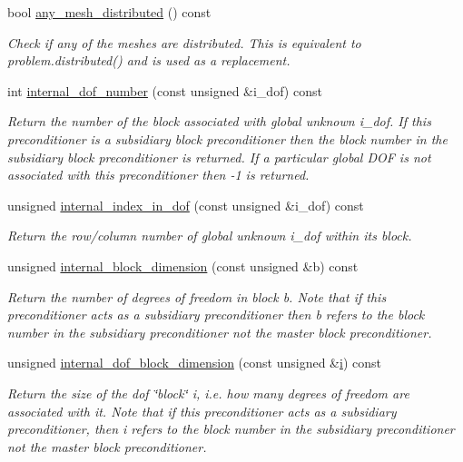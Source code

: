 \begin{DoxyCompactItemize}
bool \hyperlink{classoomph_1_1BlockPreconditioner_a6fb68db9e79048615984b005f8aa43b3}{any\+\_\+mesh\+\_\+distributed} () const
\begin{DoxyCompactList}\small\item\em Check if any of the meshes are distributed. This is equivalent to problem.\+distributed() and is used as a replacement. \end{DoxyCompactList}\item 
int \hyperlink{classoomph_1_1BlockPreconditioner_abb4dff3469cc6718103fddfdf3f3a7bb}{internal\+\_\+dof\+\_\+number} (const unsigned \&i\+\_\+dof) const
\begin{DoxyCompactList}\small\item\em Return the number of the block associated with global unknown i\+\_\+dof. If this preconditioner is a subsidiary block preconditioner then the block number in the subsidiary block preconditioner is returned. If a particular global D\+OF is not associated with this preconditioner then -\/1 is returned. \end{DoxyCompactList}\item 
unsigned \hyperlink{classoomph_1_1BlockPreconditioner_a1e0a33327b5042dfba04baf46c045373}{internal\+\_\+index\+\_\+in\+\_\+dof} (const unsigned \&i\+\_\+dof) const
\begin{DoxyCompactList}\small\item\em Return the row/column number of global unknown i\+\_\+dof within it\textquotesingle{}s block. \end{DoxyCompactList}\item 
unsigned \hyperlink{classoomph_1_1BlockPreconditioner_ac460225afc092cc5ed9d77acc6316536}{internal\+\_\+block\+\_\+dimension} (const unsigned \&b) const
\begin{DoxyCompactList}\small\item\em Return the number of degrees of freedom in block b. Note that if this preconditioner acts as a subsidiary preconditioner then b refers to the block number in the subsidiary preconditioner not the master block preconditioner. \end{DoxyCompactList}\item 
unsigned \hyperlink{classoomph_1_1BlockPreconditioner_abe03c970690224b46a29e55e16992dd7}{internal\+\_\+dof\+\_\+block\+\_\+dimension} (const unsigned \&\hyperlink{cfortran_8h_adb50e893b86b3e55e751a42eab3cba82}{i}) const
\begin{DoxyCompactList}\small\item\em Return the size of the dof \char`\"{}block\char`\"{} i, i.\+e. how many degrees of freedom are associated with it. Note that if this preconditioner acts as a subsidiary preconditioner, then i refers to the block number in the subsidiary preconditioner not the master block preconditioner. \end{DoxyCompactList}\item 

\end{DoxyCompactItemize}

